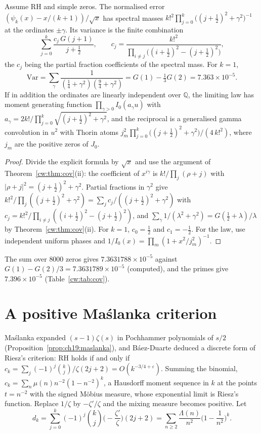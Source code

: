 \begin{proposition}\label{cw:prop:riesz}
Assume RH and simple zeros. The normalised error $(\psi_k(x)-x/(k+1))/\sqrt x$ has spectral masses $k!^2\prod_{j=0}^k\big((j+\frac12)^2+\gamma^2\big)^{-1}$ at the ordinates $\pm\gamma$. Its variance is the finite combination
\[
\sum_{j=0}^k\frac{c_j\,G(j+1)}{j+\frac12},\qquad c_j=\frac{k!^2}{\prod_{i\ne j}\big((i+\frac12)^2-(j+\frac12)^2\big)},
\]
the $c_j$ being the partial fraction coefficients of the spectral mass. For $k=1$,
\[
\mathrm{Var}=\sum_\gamma\frac{1}{(\frac14+\gamma^2)(\frac94+\gamma^2)}=G(1)-\tfrac13G(2)=7.363\times10^{-5}.
\]
If in addition the ordinates are linearly independent over $\mathbb Q$, the limiting law has moment generating function $\prod_{\gamma>0}I_0(a_\gamma u)$ with $a_\gamma=2k!\big/\prod_{j=0}^k\sqrt{(j+\frac12)^2+\gamma^2}$, and the reciprocal is a generalised gamma convolution in $u^2$ with Thorin atoms $j_m^2\prod_{j=0}^k\big((j+\frac12)^2+\gamma^2\big)/(4\,k!^2)$, where $j_m$ are the positive zeros of $J_0$.
\end{proposition}

\begin{proof}
Divide the explicit formula by $\sqrt x$ and use the argument of Theorem~\ref{cw:thm:cov}(ii): the coefficient of $x^{i\gamma}$ is $k!/\prod_j(\rho+j)$ with $|\rho+j|^2=(j+\frac12)^2+\gamma^2$. Partial fractions in $\gamma^2$ give $k!^2/\prod_j((j+\frac12)^2+\gamma^2)=\sum_jc_j/((j+\frac12)^2+\gamma^2)$ with $c_j=k!^2/\prod_{i\ne j}((i+\frac12)^2-(j+\frac12)^2)$, and $\sum_\gamma1/(\lambda^2+\gamma^2)=G(\frac12+\lambda)/\lambda$ by Theorem~\ref{cw:thm:cov}(ii). For $k=1$, $c_0=\frac12$ and $c_1=-\frac12$. For the law, use independent uniform phases and $1/I_0(x)=\prod_m(1+x^2/j_m^2)^{-1}$.
\end{proof}

The sum over $8000$ zeros gives $7.3631788\times10^{-5}$ against $G(1)-G(2)/3=7.3631789\times10^{-5}$ (computed), and the primes give $7.396\times10^{-5}$ (Table~\ref{cw:tab:cov}).

\section{A positive Ma\'slanka criterion}\label{cw:sec:maslanka}

Ma\'slanka \cite{Maslanka01} expanded $(s-1)\zeta(s)$ in Pochhammer polynomials of $s/2$ (Proposition~\ref{prop:ch19:maslanka}), and B\'aez-Duarte \cite{BaezDuarte03,BaezDuarte10} deduced a discrete form of Riesz's criterion: RH holds if and only if $c_k=\sum_{j}(-1)^j\binom kj/\zeta(2j+2)=O(k^{-3/4+\varepsilon})$. Summing the binomial, $c_k=\sum_n\mu(n)n^{-2}(1-n^{-2})^k$, a Hausdorff moment sequence in $k$ at the points $t=n^{-2}$ with the signed M\"obius measure, whose exponential limit is Riesz's function. Replace $1/\zeta$ by $-\zeta'/\zeta$ and the mixing measure becomes positive. Let
\[
d_k=\sum_{j=0}^k(-1)^j\binom kj\Big(-\frac{\zeta'}{\zeta}\Big)(2j+2)=\sum_{n\ge2}\frac{\Lambda(n)}{n^2}\Big(1-\frac1{n^2}\Big)^k .
\]

